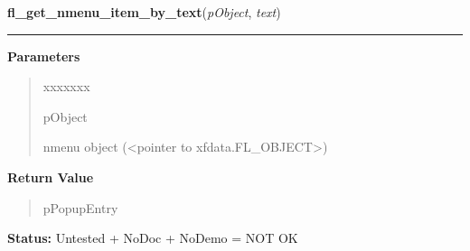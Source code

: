 \hspace{.8\funcindent}\begin{boxedminipage}{\funcwidth}

    \raggedright \textbf{fl\_get\_nmenu\_item\_by\_text}(\textit{pObject}, \textit{text})

    \vspace{-1.5ex}

    \rule{\textwidth}{0.5\fboxrule}
\setlength{\parskip}{2ex}
\setlength{\parskip}{1ex}
      \textbf{Parameters}
      \vspace{-1ex}

      \begin{quote}
        \begin{Ventry}{xxxxxxx}

          \item[pObject]

          nmenu object ({\textless}pointer to 
          xfdata.FL\_OBJECT{\textgreater})

        \end{Ventry}

      \end{quote}

      \textbf{Return Value}
    \vspace{-1ex}

      \begin{quote}
      pPopupEntry

      \end{quote}

\textbf{Status:} Untested + NoDoc + NoDemo = NOT OK



    \end{boxedminipage}

    \label{xformslib:library:fl_set_nmenu_policy}

    \vspace{0.5ex}

